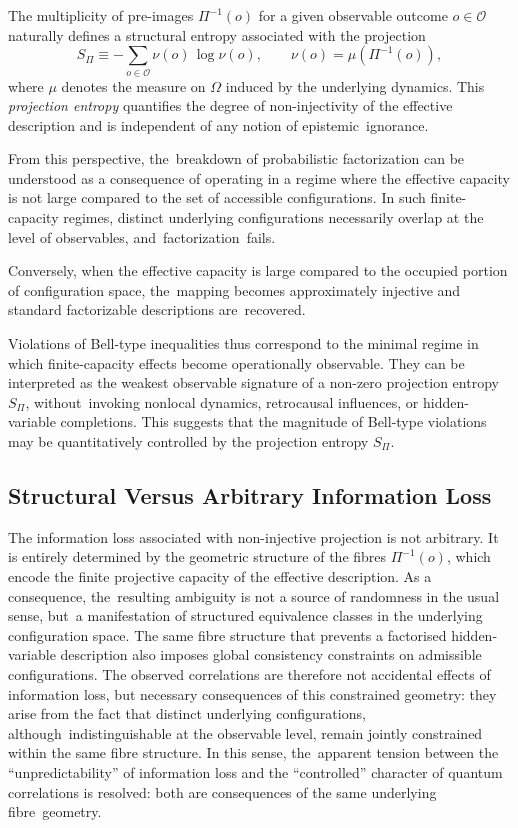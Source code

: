 \documentclass[11pt,a4paper]{article}
\theoremstyle{remark}
\begin{document}
  The multiplicity of pre-images $\Pi^{-1}(o)$ for a given observable outcome
  $o \in \mathcal{O}$ naturally defines a structural entropy associated with the
  projection
  \[
    S_{\Pi} \equiv -\sum_{o \in \mathcal{O}} \nu(o)\,\log \nu(o),
    \qquad
    \nu(o)=\mu\!\left(\Pi^{-1}(o)\right),
  \]
  where $\mu$ denotes the measure on $\Omega$ induced by the underlying dynamics.
  This \emph{projection entropy} quantifies the degree of non-injectivity of the
  effective description and is independent of any notion of epistemic~ignorance.

  From this perspective, the~breakdown of probabilistic factorization can be understood
  as a consequence of operating in a regime where the effective capacity is not large
  compared to the set of accessible configurations.
  In such finite-capacity regimes, distinct underlying configurations necessarily
  overlap at the level of observables, and~factorization~fails.

  Conversely, when the effective capacity is large compared to the occupied portion
  of configuration space, the~mapping becomes approximately injective and standard
  factorizable descriptions are~recovered.

  Violations of Bell-type inequalities thus correspond to the minimal regime in which
  finite-capacity effects become operationally observable.
  They can be interpreted as the weakest observable signature of a non-zero projection
  entropy $S_{\Pi}$, without~invoking nonlocal dynamics, retrocausal influences, or hidden-variable completions.
  This suggests that the magnitude of Bell-type violations may be quantitatively
  controlled by the projection entropy $S_{\Pi}$.

 \subsection{Structural Versus Arbitrary Information Loss}
    The information loss associated with non-injective projection is not arbitrary.
    It is entirely determined by the geometric structure of the fibres
    $\Pi^{-1}(o)$, which encode the finite projective capacity of the effective
    description.
    As a consequence, the~resulting ambiguity is not a source of randomness in the
    usual sense, but~a manifestation of structured equivalence classes in the underlying
    configuration space.
    The same fibre structure that prevents a factorised hidden-variable description also
    imposes global consistency constraints on admissible configurations.
    The observed correlations are therefore not accidental effects of information loss,
    but necessary consequences of this constrained geometry: they arise from the fact
    that distinct underlying configurations, although~indistinguishable at the observable
    level, remain jointly constrained within the same fibre structure.
    In this sense, the~apparent tension between the ``unpredictability'' of information
    loss and the ``controlled'' character of quantum correlations is resolved: both
    are consequences of the same underlying fibre~geometry.
\end{document}
